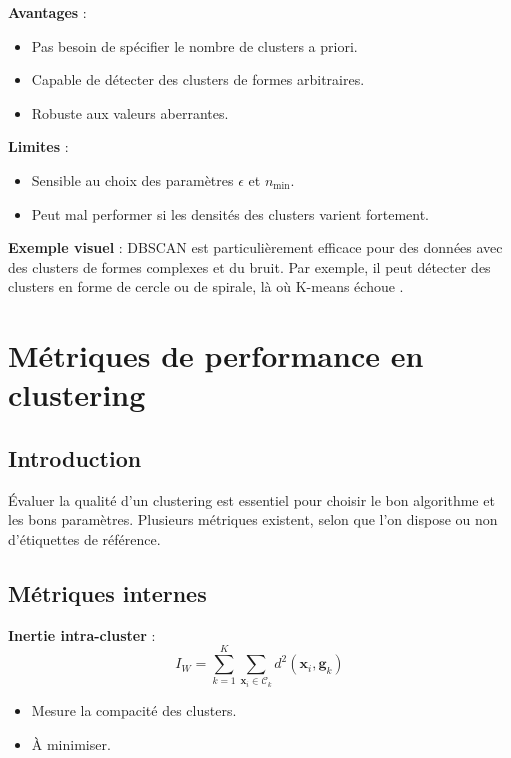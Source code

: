 \documentclass[10pt,a4paper]{article}
\begin{document}
\textbf{Avantages} :
\begin{itemize}
    \item Pas besoin de spécifier le nombre de clusters a priori.
    \item Capable de détecter des clusters de formes arbitraires.
    \item Robuste aux valeurs aberrantes.
\end{itemize}

\textbf{Limites} :
\begin{itemize}
    \item Sensible au choix des paramètres $\epsilon$ et $n_{\text{min}}$.
    \item Peut mal performer si les densités des clusters varient fortement.
\end{itemize}

\textbf{Exemple visuel} :
DBSCAN est particulièrement efficace pour des données avec des clusters de formes complexes et du bruit. Par exemple, il peut détecter des clusters en forme de cercle ou de spirale, là où K-means échoue \cite{dbscan-datacamp, dbscan-kdnuggets}.

\section*{Métriques de performance en clustering}

\subsection*{Introduction}

Évaluer la qualité d'un clustering est essentiel pour choisir le bon algorithme et les bons paramètres. Plusieurs métriques existent, selon que l'on dispose ou non d'étiquettes de référence.

\subsection*{Métriques internes}

\textbf{Inertie intra-cluster} :
$$I_W = \sum_{k=1}^{K} \sum_{\mathbf{x}_i \in \mathcal{C}_k} d^2(\mathbf{x}_i, \mathbf{g}_k)$$
\begin{itemize}
    \item Mesure la compacité des clusters.
    \item À minimiser.
\end{itemize}
\end{document}
